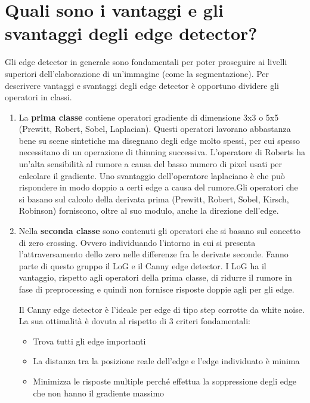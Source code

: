 \section{Quali sono i vantaggi e gli svantaggi degli edge detector?}
Gli edge detector in generale sono fondamentali per poter proseguire ai livelli superiori
dell'elaborazione di un'immagine (come la segmentazione). Per descrivere vantaggi e svantaggi degli edge detector è opportuno dividere gli operatori in classi.
\begin{enumerate}
	\item La \textbf{prima classe} contiene operatori gradiente di dimensione 3x3 o 5x5 (Prewitt, Robert, Sobel, Laplacian). Questi operatori lavorano abbastanza bene su scene sintetiche ma disegnano degli edge	molto spessi, per cui spesso necessitano di un operazione di thinning successiva. L'operatore di Roberts ha un'alta sensibilità al rumore a causa del basso numero di pixel usati per calcolare il gradiente. Uno svantaggio dell'operatore laplaciano è che può rispondere in modo doppio a certi edge a causa del rumore.Gli operatori che si basano sul calcolo della derivata prima (Prewitt, Robert, Sobel, Kirsch, Robinson) forniscono, oltre al suo modulo, anche la direzione dell'edge.
	
	\item Nella \textbf{seconda classe} sono contenuti gli operatori che si basano sul concetto di zero crossing. Ovvero individuando l'intorno in cui si presenta l'attraversamento dello zero nelle differenze fra le derivate seconde. Fanno parte di questo gruppo il LoG e il Canny edge detector. I LoG ha il vantaggio, rispetto agli operatori della prima classe, di ridurre il rumore in fase di preprocessing e	quindi non fornisce risposte doppie agli per gli edge.
	
	Il Canny edge detector è l'ideale per edge di tipo step corrotte da white noise. La sua ottimalità è dovuta al rispetto di 3 criteri fondamentali:
	\begin{itemize}
		\item Trova tutti gli edge importanti
		
		\item La distanza tra la posizione reale dell'edge e l'edge individuato è minima
		
		\item Minimizza le risposte multiple perché effettua la soppressione degli edge che non hanno il gradiente massimo
	\end{itemize}
\end{enumerate}

